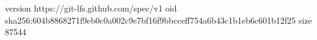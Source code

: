 version https://git-lfs.github.com/spec/v1
oid sha256:604b8868271f9eb0c0a002c9e7bf16f9bbcceff754a6b43c1b1eb6c601b12f25
size 87544
